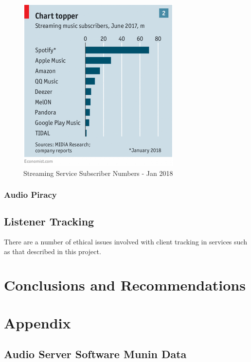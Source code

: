 \documentclass[11pt,a4paper]{scrreprt}
\begin{document}
\begin{figure}[H]
\includegraphics{Ethics/ChartTopper.png}
\centering
\caption{Streaming Service Subscriber Numbers - Jan 2018 \cite{SpotPay18}}
\label{ChartTopper}
\end{figure}

\subsection{Audio Piracy}\label{audio-piracy}

\section{Listener Tracking}\label{listener-tracking}

There are a number of ethical issues involved with client tracking in
services such as that described in this project.

\chapter{Conclusions and
Recommendations}\label{conclusions-and-recommendations}

\chapter{\texorpdfstring{Appendix
\label{Appendix}}{Appendix }}\label{appendix}

\section{Audio Server Software Munin
Data}\label{audio-server-software-munin-data}
\end{document}
